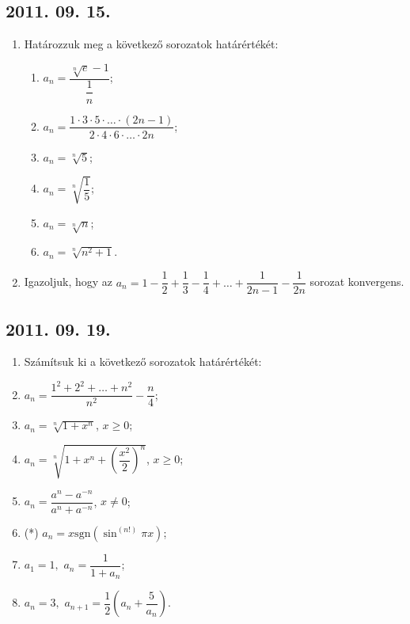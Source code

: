 \documentclass{article}
\newenvironment{abc}{\begin{enumerate}[label=\textit{\alph*})]}{\end{enumerate}}
\begin{document}
\subsection*{2011. 09. 15.}
\begin{enumerate}
\item Határozzuk meg a következő sorozatok határértékét:
	\begin{abc}
	\item $a_n=\dfrac{\sqrt[n]{e}-1}{\dfrac{1}{n}}$;
    \item $a_n=\dfrac{1\cdot3\cdot5\cdot\ldots\cdot(2n-1)}{2\cdot4\cdot6\cdot\ldots\cdot2n}$;
    \item $a_n=\sqrt[n]{5}$;
    \item $a_n=\sqrt[n]{\dfrac{1}{5}}$;
    \item $a_n=\sqrt[n]{n}$;
    \item $a_n=\sqrt[n]{n^2+1}$.
	\end{abc}
\item Igazoljuk, hogy az $a_n=1-\dfrac{1}{2}+\dfrac{1}{3}-\dfrac{1}{4}+\ldots+\dfrac{1}{2n-1}-\dfrac{1}{2n}$ sorozat konvergens.
\end{enumerate}


\subsection*{2011. 09. 19.}
\begin{enumerate}
\item Számítsuk ki a következő sorozatok határértékét:
	\item $a_n=\dfrac{1^2+2^2+\ldots+n^2}{n^2}-\dfrac{n}{4}$;     
    \item $a_n=\sqrt[n]{1+x^n}$, $x\ge0$;
    \item $a_n=\sqrt[n]{1+x^n+\left(\dfrac{x^2}{2}\right)^n}$, $x\ge0$;
    \item $a_n=\dfrac{a^n-a^{-n}}{a^n+a^{-n}}$, $x\not=0$;
    \item (*) $a_n=x\mathrm{sgn}(\sin^(n!)\pi x)$;   
    \item $a_1=1,$ $a_n=\dfrac{1}{1+a_n}$;
    \item $a_n=3,$ $a_{n+1}=\dfrac{1}{2}\left(a_n+\dfrac{5}{a_n}\right)$.
\end{enumerate}
\end{document}
